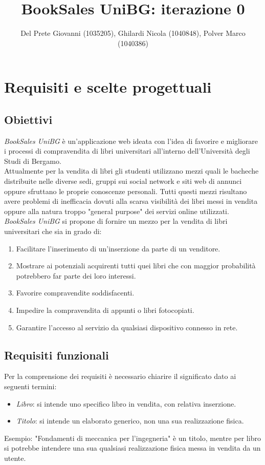 \documentclass[10pt,a4paper]{article}
\author{Del Prete Giovanni (1035205), Ghilardi Nicola (1040848), Polver Marco (1040386)}
\title{BookSales UniBG: iterazione 0}
\begin{document}
	
	\maketitle
	\tableofcontents
	
	\section{Requisiti e scelte progettuali}
	\subsection{Obiettivi}
	\textit{BookSales UniBG} è un'applicazione web ideata con l'idea di favorire e migliorare i processi di compravendita di libri universitari all'interno dell'Università degli Studi di Bergamo. 
	\\
	Attualmente per la vendita di libri gli studenti utilizzano mezzi quali le bacheche distribuite nelle diverse sedi, gruppi sui social network e siti web di annunci oppure sfruttano le proprie conoscenze personali. Tutti questi mezzi risultano avere problemi di inefficacia dovuti alla scarsa visibilità dei libri messi in vendita oppure alla natura troppo "general purpose" dei servizi online utilizzati.\\
	\textit{BookSales UniBG} si propone di fornire un mezzo per la vendita di libri universitari che sia in grado di:
	\begin{enumerate}
		\item Facilitare l'inserimento di un'inserzione da parte di un venditore.
		\item Mostrare ai potenziali acquirenti tutti quei libri che con maggior probabilità potrebbero far parte dei loro interessi.
		\item Favorire compravendite soddisfacenti.
		\item Impedire la compravendita di appunti o libri fotocopiati.
		\item Garantire l'accesso al servizio da qualsiasi dispositivo connesso in rete.
	\end{enumerate}

	\subsection{Requisiti funzionali}
	Per la comprensione dei requisiti è necessario chiarire il significato dato ai seguenti termini:
	\begin{itemize}
		\item \textit{Libro}: si intende uno specifico libro in vendita, con relativa inserzione.
		\item \textit{Titolo}: si intende un elaborato generico, non una sua realizzazione fisica.
	\end{itemize}
	Esempio: "Fondamenti di meccanica per l'ingegneria" è un titolo, mentre per libro si potrebbe intendere una sua qualsiasi realizzazione fisica messa in vendita da un utente. \\
	
\end{document}
